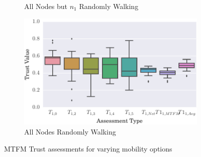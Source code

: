 \documentclass[runningheads,a4paper]{llncs}
\begin{document}
{{\begin{figure}
\begin{subfigure}{.5\textwidth}
  \caption{All Nodes but $n_1$ Randomly Walking}
  \label{fig:trust_allbut1}
\end{subfigure}
\begin{subfigure}{.5\textwidth}
\centering
  \includegraphics[width=.8\linewidth]{img/trust_bella_all_mobile_selfish.pdf}
  \caption{All Nodes Randomly Walking}
  \label{fig:trust_all_mobile}
\end{subfigure}
\caption{MTFM Trust assessments for varying mobility options}
\label{fig:trust_mobility}
\end{figure}

}}
\end{document}
